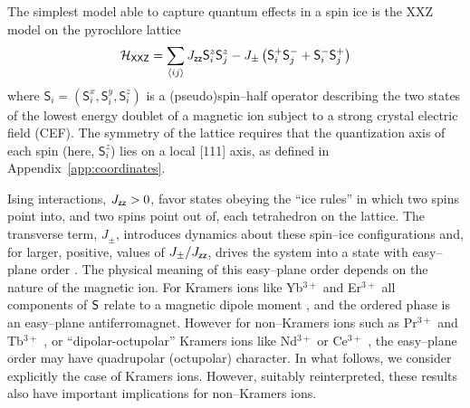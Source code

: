 \documentclass[apsrev4-1,prx,superscriptaddress,floatfix,twocolumn,longbibliography]{revtex4-1}
\begin{document}
The simplest model able to capture quantum effects in
a spin ice \cite{curnoe07,molavian07, Onoda2010, Onoda2011a,
ross11-PRX1,mcclarty14} is the XXZ model on 
the pyrochlore lattice
%
\begin{equation}
  \mathcal{H}_{\sf XXZ} = \sum_{\left<ij\right>} 
  J_{\sf zz} \mathsf{S}^z_i \mathsf{S}^z_j 
  - J_\pm \left( \mathsf{S}^+_i \mathsf{S}^-_j 
  + \mathsf{S}^-_i\mathsf{S}^+_j \right) 
    \label{eq:H.xxz}
\end{equation}
%
where $\mathsf{S}_i = (\mathsf{S}^x_i, \mathsf{S}^y_i, \mathsf{S}^z_i)$ 
is a (pseudo)spin--half operator describing the two states 
of the lowest energy doublet of a magnetic ion subject to a
strong crystal electric field (CEF).
%
The symmetry of the lattice requires that the 
quantization axis of each spin (here, $\mathsf{S}^z_i$)  
lies on a local [111] axis, as defined in Appendix~\ref{app:coordinates}.
%


Ising interactions, $J_{\sf zz}  > 0$, 
favor states obeying the ``ice rules'' in which two spins point into,
and two spins point out of, each tetrahedron on the lattice.  
%
The transverse term,  
$J_\pm$,  introduces dynamics about these spin--ice configurations and, 
for larger, positive, values of $J_\pm/J_{\sf zz}$, drives the system 
into a state with easy--plane order 
\cite{onoda11,Lee12,savary12-PRL108, wong13, yan17, owen-thesis}.  
%
The physical meaning of this easy--plane order depends on the nature 
of the magnetic ion.   
%
For Kramers ions like Yb$^{3+}$ and Er$^{3+}$ all components of $\sf S$
relate to a magnetic dipole moment \cite{ross11-PRX1}, and the ordered
phase is an easy--plane antiferromagnet.
%
However for non--Kramers ions such as Pr$^{3+}$ and Tb$^{3+}$ 
\cite{Onoda2010, petit16-PRB94}, or ``dipolar-octupolar'' Kramers ions 
like Nd$^{3+}$ or Ce$^{3+}$ \cite{huang14}, 
the easy--plane order may have quadrupolar (octupolar) character.
%
In what follows, we consider explicitly the case of Kramers ions.
%
However, suitably reinterpreted, these results also have important 
implications for non--Kramers ions.
\end{document}
